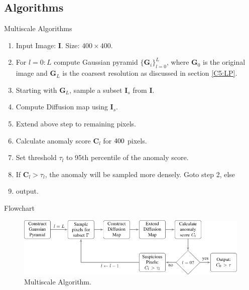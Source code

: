 \documentclass{beamer}
\theoremstyle{plain}
\theoremstyle{definition}
\theoremstyle{plain}
\theoremstyle{plain}
\begin{document}
\subsection{Algorithms}
\begin{frame}{Multiscale Algorithms}
\begin{enumerate}
\item Input Image: $\mathbf{I}$. Size: $400\times400$.
\item For $l = 0:L$ compute Gaussian pyramid $\{\mathbf{G}_{i}\}^{L}_{l=0}$, where $\mathbf{G}_{0}$ is the original image and $\mathbf{G}_{L}$ is the coarsest resolution as discussed in section \ref{C5:LP}.
\item Starting with $\mathbf{G}_L$, sample a subset $\mathbf{I}_{s}$ from $\mathbf{I}$.
\item Compute Diffusion map using $\mathbf{I}_{s}$. 
\item Extend above step to remaining pixels.
\item Calculate anomaly score $\mathbf{C}_l$ for $400\time400$ pixels.
\item Set threshold $\tau_{l}$ to 95th percentile of the anomaly score.
\item If $\mathbf{C}_l > \tau_{l}$, the anomaly will be sampled more densely. Goto step 2, else 
\item output.
\end{enumerate}

\end{frame}
\begin{frame}{Flowchart}
\begin{figure}[ht]
\begin{center}
\includegraphics[width=\textwidth]{./Figures/algo.png}
\caption {Multiscale Algorithm.}
\label{algo}
\end{center}
\end{figure}

\end{frame}

\end{document}
